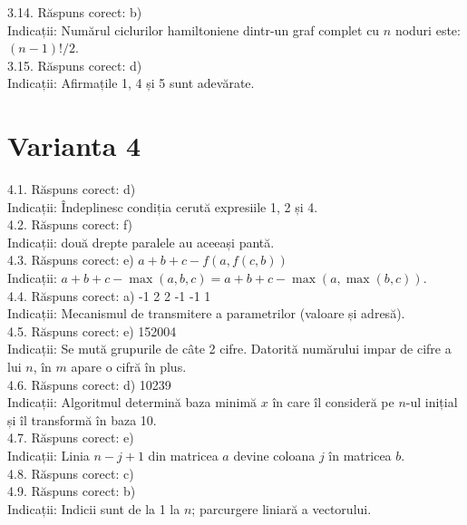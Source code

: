 3.14. Răspuns corect: b)\\
Indicații: Numărul ciclurilor hamiltoniene dintr-un graf complet cu $n$ noduri este: $(n-1)!/2$.\\

3.15. Răspuns corect: d)\\
Indicații: Afirmațile 1, 4 și 5 sunt adevărate.\\

\section*{Varianta 4}

4.1. Răspuns corect: d)\\
Indicații: Îndeplinesc condiția cerută expresiile 1, 2 și 4.\\

4.2. Răspuns corect: f)\\
Indicații: două drepte paralele au aceeași pantă.\\

4.3. Răspuns corect: e) $a+b+c-f(a, f(c, b))$\\
Indicații: $a+b+c-\max (a, b, c)=a+b+c-\max (a, \max (b, c))$.\\

4.4. Răspuns corect: a) -1 2 2 -1 -1 1\\
Indicații: Mecanismul de transmitere a parametrilor (valoare și adresă).\\

4.5. Răspuns corect: e) 152004\\
Indicații: Se mută grupurile de câte 2 cifre. Datorită numărului impar de cifre a lui $n$, în $m$ apare o cifră în plus.\\

4.6. Răspuns corect: d) 10239\\
Indicații: Algoritmul determină baza minimă $x$ în care îl consideră pe $n$-ul inițial și îl transformă în baza 10.\\

4.7. Răspuns corect: e)\\
Indicații: Linia $n - j + 1$ din matricea $a$ devine coloana $j$ în matricea $b$.\\

4.8. Răspuns corect: c)\\

4.9. Răspuns corect: b)\\
Indicații: Indicii sunt de la 1 la $n$; parcurgere liniară a vectorului.\\

